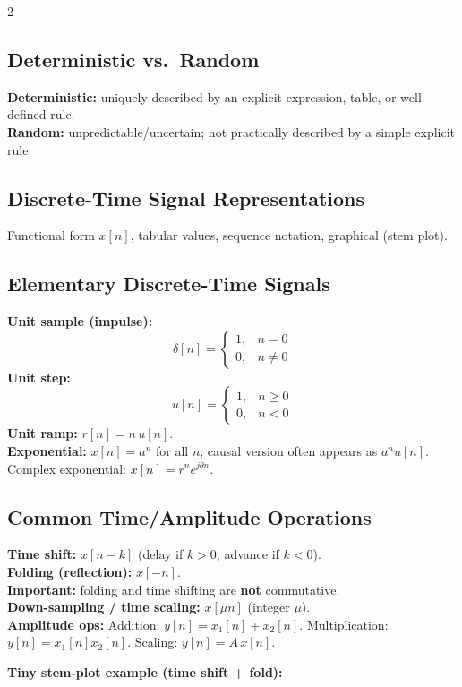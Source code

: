 \documentclass[10pt]{article}
\begin{document}
\begin{multicols}{2}
\subsection{Deterministic vs.\ Random}
\textbf{Deterministic:} uniquely described by an explicit expression, table, or well-defined rule.\\
\textbf{Random:} unpredictable/uncertain; not practically described by a simple explicit rule.

\subsection{Discrete-Time Signal Representations}
Functional form $x[n]$, tabular values, sequence notation, graphical (stem plot).

\subsection{Elementary Discrete-Time Signals}
\textbf{Unit sample (impulse):}
\[
\delta[n] =
\begin{cases}
1, & n=0\\
0, & n\neq 0
\end{cases}
\]
\textbf{Unit step:}
\[
u[n] =
\begin{cases}
1, & n\ge 0\\
0, & n<0
\end{cases}
\]
\textbf{Unit ramp:} $r[n] = n\,u[n]$.\\
\textbf{Exponential:} $x[n]=a^n$ for all $n$; causal version often appears as $a^n u[n]$.\\
Complex exponential: $x[n]=r^n e^{j\theta n}$.

\subsection{Common Time/Amplitude Operations}
\textbf{Time shift:} $x[n-k]$ (delay if $k>0$, advance if $k<0$).\\
\textbf{Folding (reflection):} $x[-n]$.\\
\textbf{Important:} folding and time shifting are \textbf{not} commutative.\\
\textbf{Down-sampling / time scaling:} $x[\mu n]$ (integer $\mu$).\\
\textbf{Amplitude ops:}
Addition: $y[n]=x_1[n]+x_2[n]$.\quad
Multiplication: $y[n]=x_1[n]x_2[n]$.\quad
Scaling: $y[n]=A\,x[n]$.

\vspace{0.25em}
\textbf{Tiny stem-plot example (time shift + fold):}
\begin{center}
\end{center}
\end{multicols}
\end{document}
